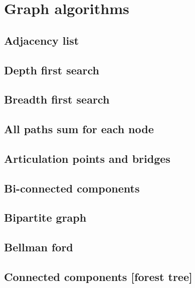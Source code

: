 \section{Graph algorithms}
\subsection{Adjacency list}
\raggedbottom
\hrulefill
\subsection{Depth first search}
\raggedbottom
\hrulefill
\subsection{Breadth first search}
\raggedbottom
\hrulefill
\subsection{All paths sum for each node}
\raggedbottom
\hrulefill
\subsection{Articulation points and bridges}
\raggedbottom
\hrulefill
\subsection{Bi-connected components}
\raggedbottom
\hrulefill
\subsection{Bipartite graph}
\raggedbottom
\hrulefill
\subsection{Bellman ford}
\raggedbottom
\hrulefill
\subsection{Connected components [forest tree]}
\raggedbottom
\hrulefill

